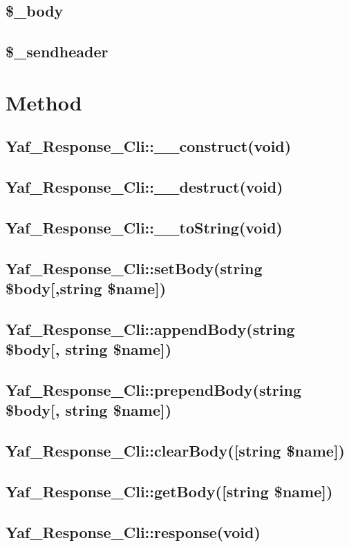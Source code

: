 \subsection{\$\_body}


\subsection{\$\_sendheader}


\section{Method}

\subsection{Yaf\_Response\_Cli::\_\_construct(void)}
\subsection{Yaf\_Response\_Cli::\_\_destruct(void)}
\subsection{Yaf\_Response\_Cli::\_\_toString(void)}
\subsection{Yaf\_Response\_Cli::setBody(string \$body[,string \$name])}
\subsection{Yaf\_Response\_Cli::appendBody(string \$body[, string \$name])}
\subsection{Yaf\_Response\_Cli::prependBody(string \$body[, string \$name])}
\subsection{Yaf\_Response\_Cli::clearBody([string \$name])}
\subsection{Yaf\_Response\_Cli::getBody([string \$name])}
\subsection{Yaf\_Response\_Cli::response(void)}




